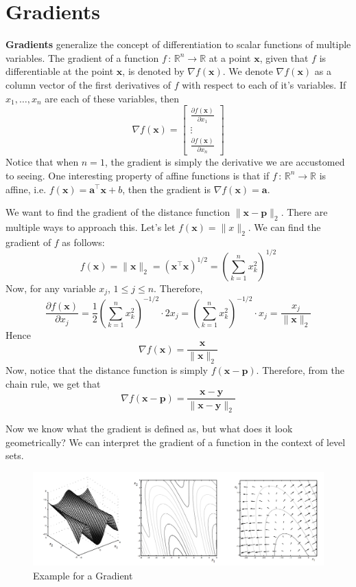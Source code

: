\documentclass[12pt]{article}
\begin{document}
\section{Gradients}
\textbf{Gradients} generalize the concept of differentiation to scalar functions of multiple variables. The gradient of a function $f\,:\,\mathbb{R}^n\to\mathbb{R}$ at a point $\mathbf{x}$, given that $f$ is differentiable at the point $\mathbf{x}$, is denoted by $\nabla f(\mathbf{x})$. We denote $\nabla f(\mathbf{x})$ as a column vector of the first derivatives of $f$ with respect to each of it's variables. If $x_1,\ldots,x_n$ are each of these variables, then $$\nabla f(\mathbf{x}) = \begin{bmatrix} \frac{\partial f(\mathbf{x})}{\partial x_1} \\ \vdots \\ \frac{\partial f(\mathbf{x})}{\partial x_n}\end{bmatrix}$$ Notice that when $n=1$, the gradient is simply the derivative we are accustomed to seeing. One interesting property of affine functions is that if $f\,:\,\mathbb{R}^n\to\mathbb{R}$ is affine, i.e. $f(\mathbf{x}) = \mathbf{a}^\top\mathbf{x}+b$, then the gradient is $\nabla f(\mathbf{x}) = \mathbf{a}$. 
\begin{example}
We want to find the gradient of the distance function $\|\mathbf{x}-\mathbf{p}\|_2$. There are multiple ways to approach this. Let's let $f(\mathbf{x}) = \|x\|_2$. We can find the gradient of $f$ as follows: $$f(\mathbf{x}) = \|\mathbf{x}\|_2 = (\mathbf{x}^\top\mathbf{x})^{1/2} = \left(\sum_{k=1}^n x_k^2\right)^{1/2}$$ Now, for any variable $x_j$, $1\leqslant j\leqslant n$. Therefore, $$\frac{\partial f(\mathbf{x})}{\partial x_j} = \frac{1}{2}\left(\sum_{k=1}^n x_k^2\right)^{-1/2}\cdot 2 x_j = \left(\sum_{k=1}^n x_k^2\right)^{-1/2}\cdot x_j = \frac{x_j}{\|\mathbf{x}\|_2}$$ Hence $$\nabla f(\mathbf{x}) = \frac{\mathbf{x}}{\|\mathbf{x}\|_2}$$
Now, notice that the distance function is simply $f(\mathbf{x}-\mathbf{p})$. Therefore, from the chain rule, we get that $$\nabla f(\mathbf{x}-\mathbf{p}) = \frac{\mathbf{x}-\mathbf{y}}{\|\mathbf{x} - \mathbf{y}\|_2}$$
\end{example}
\noindent Now we know what the gradient is defined as, but what does it look geometrically? We can interpret the gradient of a function in the context of level sets.

 \begin{figure}[h!]\begin{center}\includegraphics[scale=0.3]{figures/gradient1}\caption{Example for a Gradient}\end{center}\end{figure}
 
\end{document}
